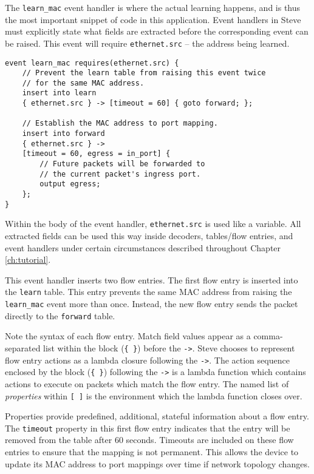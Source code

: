 The \texttt{learn\_mac} event handler is where the actual
learning happens, and is thus the most important snippet of code in this
application. Event handlers in Steve must explicitly state what fields are extracted before the corresponding event can be raised. This event will require \texttt{ethernet.src} -- the address being learned.

\begin{lstlisting}
event learn_mac requires(ethernet.src) {
	// Prevent the learn table from raising this event twice
	// for the same MAC address.
	insert into learn
	{ ethernet.src } -> [timeout = 60] { goto forward; };

	// Establish the MAC address to port mapping.
	insert into forward
	{ ethernet.src } ->
	[timeout = 60, egress = in_port] {
		// Future packets will be forwarded to
		// the current packet's ingress port.
		output egress;
	};
}
\end{lstlisting}

Within the body of the event handler, \texttt{ethernet.src} is used like a variable. All extracted fields can be used this way inside decoders, tables/flow entries, and event handlers under certain circumstances described throughout Chapter \ref{ch:tutorial}.

This event handler inserts two flow entries.
The first flow entry is inserted into
the \texttt{learn} table. 
This entry prevents the same MAC address from raising the
\texttt{learn\_mac} event more than once.
Instead, the new flow entry sends the packet directly to the \texttt{forward} 
table.

Note the syntax of each flow entry. Match field values appear as a comma-separated list within the block (\texttt{\{ \}}) before the \texttt{->}. Steve chooses to represent flow entry actions as a lambda closure following the \texttt{->}. The action sequence enclosed by the block (\texttt{\{ \}}) following the \texttt{->} is a lambda function which contains actions to execute on packets which match the flow entry. The named list of \emph{properties} within \texttt{[ ]} is the environment which the lambda function closes over.

Properties provide predefined, additional, stateful information about a flow entry. The \texttt{timeout} property in this first flow entry indicates that the entry will be removed from the table after 60 seconds. Timeouts are included on these flow entries to ensure that the
mapping is not permanent. This allows the device to update its
MAC address to port mappings over time if network topology changes.

